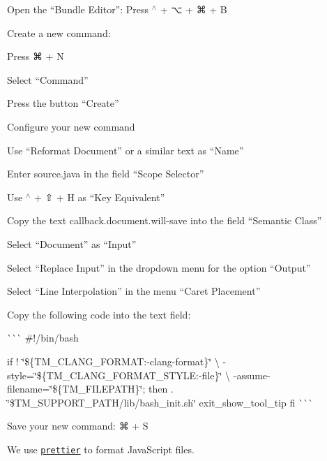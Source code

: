 \begin{DoxyEnumerate}
\item Open the “\+Bundle Editor”\+: Press {\ttfamily $^\wedge$} + {\ttfamily ⌥} + {\ttfamily ⌘} + {\ttfamily B}
\item Create a new command\+:
\begin{DoxyEnumerate}
\item Press {\ttfamily ⌘} + {\ttfamily N}
\item Select “\+Command”
\item Press the button “\+Create”
\end{DoxyEnumerate}
\item Configure your new command
\begin{DoxyEnumerate}
\item Use “\+Reformat Document” or a similar text as “\+Name”
\item Enter {\ttfamily source.\+java} in the field “\+Scope Selector”
\item Use {\ttfamily $^\wedge$} + {\ttfamily ⇧} + {\ttfamily H} as “\+Key Equivalent”
\item Copy the text {\ttfamily callback.\+document.\+will-\/save} into the field “\+Semantic Class”
\item Select “\+Document” as “\+Input”
\item Select “\+Replace Input” in the dropdown menu for the option “\+Output”
\item Select “\+Line Interpolation” in the menu “\+Caret Placement”
\item Copy the following code into the text field\+:

\`{}\`{}\`{} \#!/bin/bash

if ! \char`\"{}\$\{\+T\+M\+\_\+\+C\+L\+A\+N\+G\+\_\+\+F\+O\+R\+M\+A\+T\+:-\/clang-\/format\}\char`\"{} \textbackslash{} -\/style=\char`\"{}\$\{\+T\+M\+\_\+\+C\+L\+A\+N\+G\+\_\+\+F\+O\+R\+M\+A\+T\+\_\+\+S\+T\+Y\+L\+E\+:-\/file\}\char`\"{} \textbackslash{} -\/assume-\/filename=\char`\"{}\$\{\+T\+M\+\_\+\+F\+I\+L\+E\+P\+A\+T\+H\}\char`\"{}; then . \char`\"{}\$\+T\+M\+\_\+\+S\+U\+P\+P\+O\+R\+T\+\_\+\+P\+A\+T\+H/lib/bash\+\_\+init.\+sh\char`\"{} exit\+\_\+show\+\_\+tool\+\_\+tip fi \`{}\`{}\`{}
\item Save your new command\+: {\ttfamily ⌘} + {\ttfamily S}
\end{DoxyEnumerate}
\end{DoxyEnumerate}

We use \href{https://prettier.io}{\texttt{ {\ttfamily prettier}}} to format Java\+Script files.

